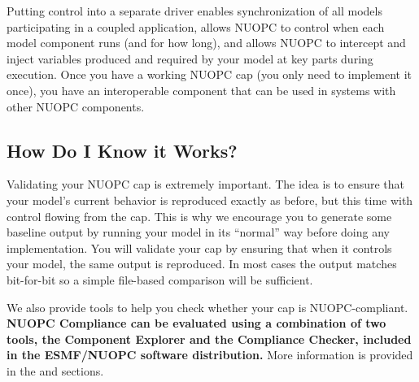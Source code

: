 Putting control into a separate driver enables synchronization
of all models participating in a coupled application, allows NUOPC
to control when each model component runs (and for how long), and allows
NUOPC to intercept and inject variables produced and required
by your model at key parts during execution.  Once you have a working
NUOPC cap (you only need to implement it once), you have an interoperable
component that can be used in systems with other NUOPC components.


\subsection{How Do I Know it Works?}
Validating your NUOPC cap is extremely important.  The idea is to
ensure that your model's current behavior is reproduced
exactly as before, but this time with control flowing from the cap.  This is
why we encourage you to generate some baseline output by running
your model in its ``normal'' way before doing any implementation.
You will validate your cap by ensuring that when it controls your model,
the same output is reproduced. In most cases the output matches bit-for-bit
so a simple file-based comparison will be sufficient.

We also provide tools to help you check whether your cap is NUOPC-compliant.
\textbf{NUOPC Compliance can be evaluated using a combination of two tools, the Component
Explorer and the Compliance Checker, included in the ESMF/NUOPC software distribution.}
More information is provided in the  and
 sections.
